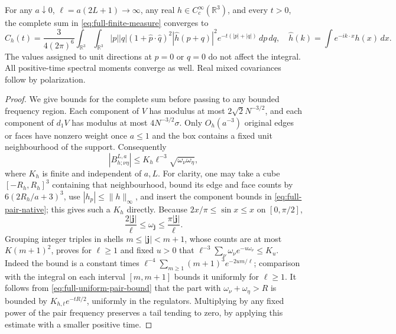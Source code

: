 \begin{theorem}\label{thm:full-comparison-limit}
For any $a\downarrow0$, $\ell=a(2L+1)\longrightarrow\infty$, any
real $h\in C_c^\infty(\mathbb R^3)$, and every $t>0$, the complete
sum in \eqref{eq:full-finite-measure} converges to
\begin{equation}\label{eq:full-momentum-integral}
 C_h(t)=\frac{3}{4(2\pi)^6}
 \int_{\mathbb R^3}\int_{\mathbb R^3}
 |p||q|(1+\widehat p\cdot\widehat q)^2
 |\widehat h(p+q)|^2 e^{-t(|p|+|q|)}\,dp\,dq,
 \quad \widehat h(k)=\int e^{-ik\cdot x}h(x)\,dx.
\end{equation}
The values assigned to unit directions at $p=0$ or $q=0$ do not
affect the integral. All positive-time spectral moments converge as
well. Real mixed covariances follow by polarization.
\end{theorem}
\begin{proof}
We give bounds for the complete sum before passing to any bounded
frequency region. Each component of $V$ has modulus at most
$2\sqrt2N^{-3/2}$, and each component of $d_1V$ has modulus at most
$4N^{-3/2}\sigma$. Only $O_h(a^{-3})$ original edges or faces have
nonzero weight once $a\le1$ and the box contains a fixed unit
neighbourhood of the support. Consequently
\begin{equation}\label{eq:full-uniform-pair-bound}
 |B_{h;\nu\eta}^{L,a}|
       \le K_h\ell^{-3}\sqrt{\omega_\nu\omega_\eta},
\end{equation}
where $K_h$ is finite and independent of $a,L$. For clarity, one may
take a cube $[-R_h,R_h]^3$ containing that neighbourhood, bound its
edge and face counts by $6(2R_h/a+3)^3$, use
$|h_p|\le\|h\|_\infty$, and insert the component bounds in
\eqref{eq:full-pair-native}; this gives such a $K_h$ directly.
Because $2x/\pi\le\sin x\le x$ on $[0,\pi/2]$,
\[
 \frac{2|\boldsymbol j|}{\ell}\le\omega_{\boldsymbol j}
       \le\frac{\pi|\boldsymbol j|}{\ell}.
\]
Grouping integer triples in shells $m\le|\boldsymbol j|<m+1$,
whose counts are at most $K(m+1)^2$, proves for $\ell\ge1$
and fixed $u>0$ that
$\ell^{-3}\sum_\nu\omega_\nu e^{-u\omega_\nu}\le K_u$.
Indeed the bound is a constant times
$\ell^{-4}\sum_{m\ge1}(m+1)^3e^{-2um/\ell}$; comparison with the
integral on each interval $[m,m+1]$ bounds it uniformly for
$\ell\ge1$. It follows from \eqref{eq:full-uniform-pair-bound} that
the part with $\omega_\nu+\omega_\eta>R$ is bounded by
$K_{h,t}e^{-tR/2}$, uniformly in the regulators. Multiplying by any
fixed power of the pair frequency preserves a tail tending to zero,
by applying this estimate with a smaller positive time.


\end{proof}
